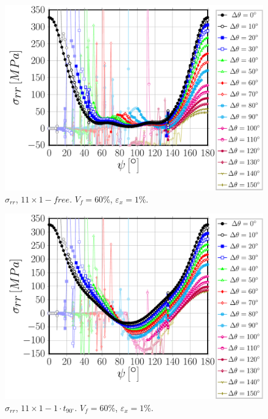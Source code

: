 \documentclass[review]{elsarticle}
\begin{document}
\begin{figure}[!h]
\centering
\includegraphics[width=\textwidth]{S5A0free-circum-sigmar.pdf}
\caption{$\sigma_{rr}$, $11\times 1-free$. $V_{f}=60\%$, $\varepsilon_{x}=1\%$.}\label{}
\end{figure}

\begin{figure}[!h]
\centering
\includegraphics[width=\textwidth]{S5A0T1-circum-sigmar.pdf}
\caption{$\sigma_{rr}$, $11\times 1-1\cdot t_{90^{\circ}}$. $V_{f}=60\%$, $\varepsilon_{x}=1\%$.}\label{}
\end{figure}
\end{document}
